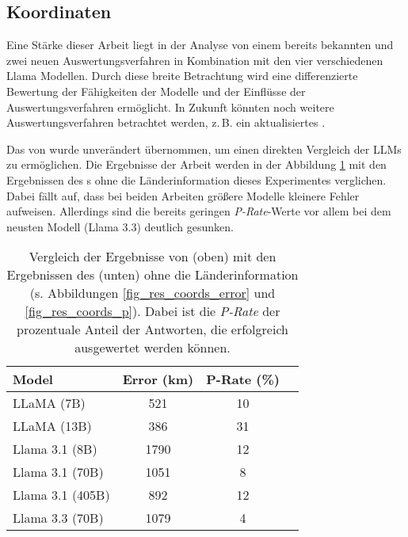 \subsection*{Koordinaten}

Eine Stärke dieser Arbeit liegt in der Analyse von einem bereits bekannten und zwei neuen Auswertungsverfahren in Kombination mit den vier verschiedenen Llama Modellen.
Durch diese breite Betrachtung wird eine differenzierte Bewertung der Fähigkeiten der Modelle und der Einflüsse der Auswertungsverfahren ermöglicht.
In Zukunft könnten noch weitere Auswertungsverfahren betrachtet werden, z.\,B. ein aktualisiertes \regexv{}.

Das \regexv{} von \citet{bhandariAreLargeLanguage2023} wurde unverändert übernommen, um einen direkten Vergleich der LLMs zu ermöglichen.
Die Ergebnisse der Arbeit werden in der Abbildung \ref{comparison_original} mit den Ergebnissen des \regexv{}s ohne die Länderinformation dieses Experimentes verglichen.
Dabei fällt auf, dass bei beiden Arbeiten größere Modelle kleinere Fehler aufweisen.
Allerdings sind die bereits geringen \textit{P-Rate}-Werte vor allem bei dem neusten Modell (Llama 3.3) deutlich gesunken.

\begin{table}[tb] %
    \centering

    \begin{tabular}{lccc}
        \toprule
        Model & Error (km) & P-Rate (\%) \\
        \midrule
        LLaMA (7B) & 521 & 10 \\
        LLaMA (13B) & 386 & 31 \\
        \midrule
        Llama 3.1 (8B)  & 1790 & 12 \\
        Llama 3.1 (70B) & 1051 & 8 \\
        Llama 3.1 (405B) & 892 & 12 \\
        Llama 3.3 (70B) & 1079 & 4 \\
        \bottomrule
    \end{tabular}

    \caption{Vergleich der Ergebnisse von \citet{bhandariAreLargeLanguage2023} (oben) mit den Ergebnissen des \regexv{} (unten) ohne die Länderinformation (s. Abbildungen \ref{fig_res_coords_error} und \ref{fig_res_coords_p}). Dabei ist die \textit{P-Rate} der prozentuale Anteil der Antworten, die erfolgreich ausgewertet werden können.}

    \label{comparison_original}
\end{table}

